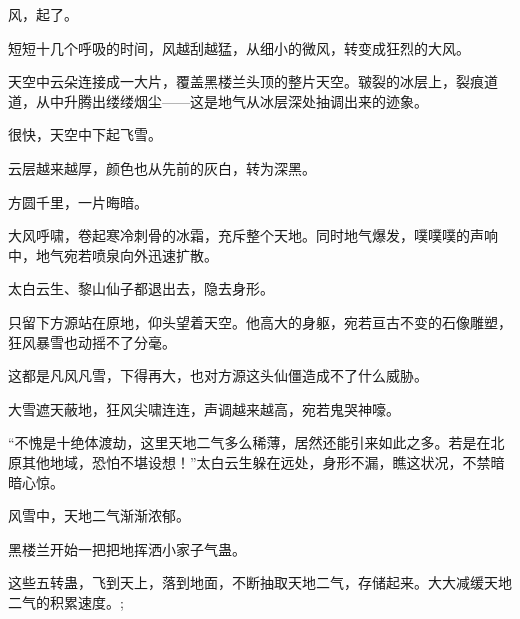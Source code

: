 \begin{this_body}
风，起了。

短短十几个呼吸的时间，风越刮越猛，从细小的微风，转变成狂烈的大风。

天空中云朵连接成一大片，覆盖黑楼兰头顶的整片天空。皲裂的冰层上，裂痕道道，从中升腾出缕缕烟尘——这是地气从冰层深处抽调出来的迹象。

很快，天空中下起飞雪。

云层越来越厚，颜色也从先前的灰白，转为深黑。

方圆千里，一片晦暗。

大风呼啸，卷起寒冷刺骨的冰霜，充斥整个天地。同时地气爆发，噗噗噗的声响中，地气宛若喷泉向外迅速扩散。

太白云生、黎山仙子都退出去，隐去身形。

只留下方源站在原地，仰头望着天空。他高大的身躯，宛若亘古不变的石像雕塑，狂风暴雪也动摇不了分毫。

这都是凡风凡雪，下得再大，也对方源这头仙僵造成不了什么威胁。

大雪遮天蔽地，狂风尖啸连连，声调越来越高，宛若鬼哭神嚎。

“不愧是十绝体渡劫，这里天地二气多么稀薄，居然还能引来如此之多。若是在北原其他地域，恐怕不堪设想！”太白云生躲在远处，身形不漏，瞧这状况，不禁暗暗心惊。

风雪中，天地二气渐渐浓郁。

黑楼兰开始一把把地挥洒小家子气蛊。

这些五转蛊，飞到天上，落到地面，不断抽取天地二气，存储起来。大大减缓天地二气的积累速度。;

\end{this_body}

